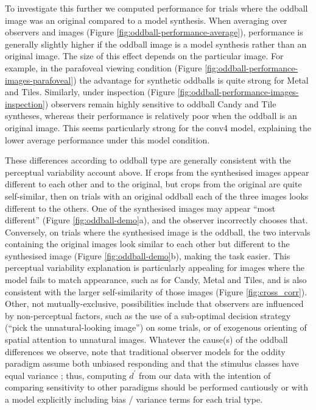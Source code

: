 \documentclass[article, 11pt,a4paper,natbib]{apa6}\usepackage[]{graphicx}\usepackage[]{color}
\begin{document}
To investigate this further we computed performance for trials where the oddball image was an original compared to a model synthesis.
When averaging over observers and images (Figure \ref{fig:oddball-performance-average}), performance is generally slightly higher if the oddball image is a model synthesis rather than an original image.
The size of this effect depends on the particular image.  
For example, in the parafoveal viewing condition (Figure \ref{fig:oddball-performance-images-parafoveal}) the advantage for synthetic oddballs is quite strong for Metal and Tiles.
Similarly, under inspection (Figure \ref{fig:oddball-performance-images-inspection}) observers remain highly sensitive to oddball Candy and Tile syntheses, whereas their performance is relatively poor when the oddball is an original image.
This seems particularly strong for the conv4 model, explaining the lower average performance under this model condition.

These differences according to oddball type are generally consistent with the perceptual variability account above.
If crops from the synthesised images appear different to each other and to the original, but crops from the original are quite self-similar, then on trials with an original oddball each of the three images looks different to the others.
One of the synthesised images may appear ``most different'' (Figure \ref{fig:oddball-demo}a), and the observer incorrectly chooses that.
Conversely, on trials where the synthesised image is the oddball, the two intervals containing the original images look similar to each other but different to the synthesised image (Figure \ref{fig:oddball-demo}b), making the task easier.
This perceptual variability explanation is particularly appealing for images where the model fails to match appearance, such as for Candy, Metal and Tiles, and is also consistent with the larger self-similarity of those images (Figure \ref{fig:cross_corr}).
Other, not mutually-exclusive, possibilities include that observers are influenced by non-perceptual factors, such as the use of a sub-optimal decision strategy (``pick the unnatural-looking image'') on some trials, or of exogenous orienting of spatial attention to unnatural images. 
Whatever the cause(s) of the oddball differences we observe, note that traditional observer models for the oddity paradigm assume both unbiased responding and that the stimulus classes have equal variance \citep[][p. 235]{macmillan_detection_2005}; thus, computing $d^\prime$ from our data with the intention of comparing sensitivity to other paradigms should be performed cautiously or with a model explicitly including bias / variance terms for each trial type.
\end{document}
